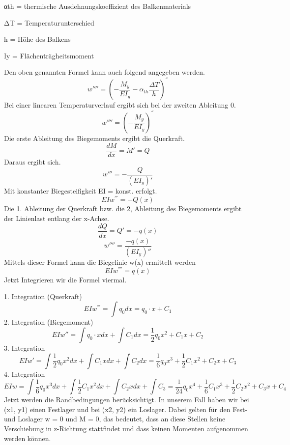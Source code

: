 αth = thermische Ausdehnungskoeffizient des Balkenmaterials

ΔT = Temperaturunterschied

h = Höhe des Balkens

Iy = Flächenträgheitsmoment

Den oben genannten Formel kann auch folgend angegeben werden.
\begin{equation}
	w''''=
	\left(-\frac{M_y}{EI_y}-\alpha_{th}\frac{\Delta T}{h}\right)^{''}
\end{equation}
Bei einer linearen Temperaturverlauf ergibt sich bei der zweiten Ableitung 0.
\begin{equation}
	w''''=
	\left(-\frac{M_y}{EI_y}\right)^{''}
\end{equation}
Die erste Ableitung des Biegemoments ergibt die Querkraft.
\begin{equation}
	\frac{dM}{dx}=
	M'=
	Q
\end{equation}
Daraus ergibt sich.
\begin{equation}
	w'''=
	-\frac{Q}{(EI_y)'}
\end{equation}
Mit konstanter Biegesteifigkeit EI = konst. erfolgt.
\begin{equation}
	EIw^{'''}=
	-Q\left(x\right)
\end{equation}
Die 1. Ableitung der Querkraft bzw. die 2, Ableitung des Biegemoments ergibt der Linienlast entlang der x-Achse.
\begin{equation}
	\frac{dQ}{dx}=
	Q'=
	-q(x)
\end{equation}
\begin{equation}
	w''''=
	\frac{-q(x)}{(EI_y)''}
\end{equation}
Mittels dieser Formel kann die Biegelinie w(x) ermittelt werden
\begin{equation}
	EIw^{''''}=
	q\left(x\right) 
\end{equation}
Jetzt Integrieren wir die Formel viermal.

1. Integration (Querkraft)
\begin{equation}
	EIw^{'''}=
	\int q_0dx=
	q_0\cdot x+C_1
\end{equation}
2. Integration (Biegemoment)
\begin{equation}
	EIw''=
	\int{q_0\cdot x}dx+\int C_1dx=
	\frac{1}{2}q_0x^2+C_1x+C_2
\end{equation}
3. Integration
\begin{equation}
	EIw'=
	\int{\frac{1}{2}q_0x^2}dx+\int{C_1x}dx+\int C_2dx=
	\frac{1}{6}q_0x^3+\frac{1}{2}C_1x^2+C_2x+C_3
\end{equation}
4. Integration
\begin{equation}
	EIw=
	\int{\frac{1}{6}q_0x^3}dx+\int{\frac{1}{2}C_1x^2}dx+\int{C_2x}dx+\int C_3=
	\frac{1}{24}q_0x^4+\frac{1}{6}C_1x^3+\frac{1}{2}C_2x^2+C_3x+C_4
\end{equation}
Jetzt werden die Randbedingungen berücksichtigt.
In unserem Fall haben wir bei (x1, y1) einen Festlager und bei (x2, y2) ein Loslager.
Dabei gelten für den Fest- und Loslager w = 0 und M = 0, das bedeutet, dass an diese Stellen keine Verschiebung in z-Richtung stattfindet und dass keinen Momenten aufgenommen werden können.

